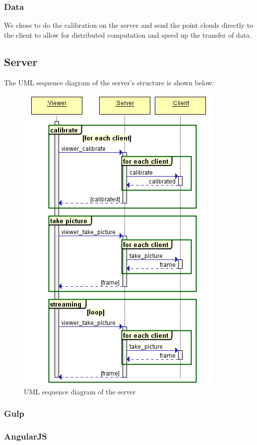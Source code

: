 \documentclass{article}
\begin{document}
\subsubsection{Data}
We chose to do the calibration on the server and send the point clouds directly to the client to allow for distributed computation and speed up the transfer of data.
\subsection{Server}
The UML sequence diagram of the server's structure is shown below:
\begin{figure}[h]
  \centering
  \includegraphics[scale=0.6]{serverUML}
  \caption{UML sequence diagram of the server}
\end{figure}
\subsubsection{Gulp} %
\subsubsection{AngularJS}
\end{document}
